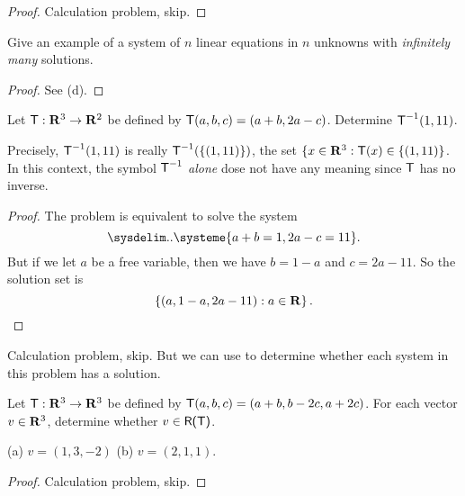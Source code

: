 \begin{proof} Calculation problem, skip. \end{proof}

\begin{exercise} \label{exercise 3.3.5}
Give an example of a system of \(n\) linear equations in \(n\) unknowns with \emph{infinitely many} solutions.
\end{exercise}

\begin{proof}
See (d).
\end{proof}

\begin{exercise} \label{exercise 3.3.6}
Let \(\textsf{T}: \mathbf{R}^3 \to \mathbf{R}^2\) be defined by \(\textsf{T}(a, b, c) = (a + b, 2a - c)\).
Determine \(\textsf{T}^{-1}(1, 11)\).
\end{exercise}

\begin{note}
Precisely, \(\textsf{T}^{-1}(1, 11)\) is really \(\textsf{T}^{-1}(\{ (1, 11) \})\), the set \(\{x \in \mathbf{R}^3: \textsf{T}(x) \in \{ (1, 11) \}\).
In this context, the symbol \(\textsf{T}^{-1}\) \emph{alone} dose not have any meaning since \(\textsf{T}\) has no inverse.
\end{note}

\begin{proof}
The problem is equivalent to solve the system
\[
    \sysdelim..\systeme{
        a + b = 1,
        2a - c = 11
    }.
\]
But if we let \(a\) be a free variable, then we have \(b = 1 - a\) and \(c = 2a - 11\).
So the solution set is
\[
    \left\{ (a, 1 - a, 2a - 11) : a \in \mathbf{R} \right\}.
\]
\end{proof}

\begin{exercise} \label{exercise 3.3.7}
Calculation problem, skip.
But we can use  to determine whether each system in this problem has a solution.
\end{exercise}

\begin{exercise} \label{exercise 3.3.8}
Let \(\textsf{T}: \mathbf{R}^3 \to \mathbf{R}^3\) be defined by \(\textsf{T}(a, b, c) = (a + b, b - 2c, a + 2c)\).
For each vector \(v \in \mathbf{R}^3\), determine whether \(v \in \textsf{R(T)}\).

(a) \(v = (1, 3, -2)\) (b) \(v = (2, 1, 1)\).
\end{exercise}

\begin{proof}
Calculation problem, skip.
\end{proof}

